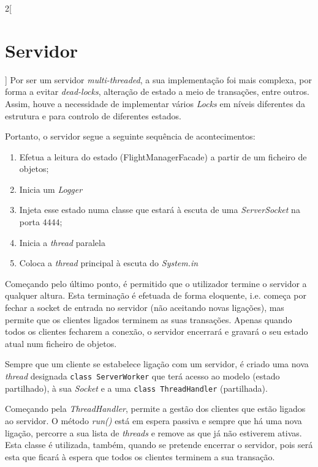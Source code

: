 \documentclass[a4paper,11pt]{article}
\begin{document}
\begin{multicols}{2}[\section{Servidor}]
    Por ser um servidor \textit{multi-threaded}, a sua implementação foi
    mais complexa, por forma a evitar \textit{dead-locks}, alteração de estado
    a meio de transações, entre outros.
    Assim, houve a necessidade de implementar vários \textit{Locks} em níveis
    diferentes da estrutura e para controlo de diferentes estados.
    
    Portanto, o servidor segue a seguinte sequência de acontecimentos:
    \begin{enumerate}
        \item Efetua a leitura do estado (FlightManagerFacade) a partir de um ficheiro de objetos;
        \item Inicia um \textit{Logger}
        \item Injeta esse estado numa classe que estará à escuta de uma \textit{ServerSocket} na porta $4444$;
        \item Inicia a \textit{thread} paralela
        \item Coloca a \textit{thread} principal à escuta do \textit{System.in}
    \end{enumerate}
    Começando pelo último ponto, é permitido que o utilizador termine o servidor a qualquer
    altura. Esta terminação é efetuada de forma eloquente, i.e. começa por fechar a socket
    de entrada no servidor (não aceitando novas ligações), mas permite que os clientes ligados terminem as suas transações.
    Apenas quando todos os clientes fecharem a conexão, o servidor encerrará e gravará 
    o seu estado atual num ficheiro de objetos.
    
    Sempre que um cliente se estabelece ligação com um servidor, é criado uma
    nova \textit{thread} designada \texttt{class ServerWorker}
    que terá acesso ao modelo (estado partilhado), à sua \textit{Socket}
    e a uma \texttt{class ThreadHandler} (partilhada).
    
    Começando pela \textit{ThreadHandler}, permite a gestão dos clientes que estão
    ligados ao servidor.
    O método \textit{run()} está em espera passiva e sempre que há uma nova ligação,
    percorre a sua lista de \textit{threads} e remove as que já não estiverem ativas.
    Esta classe é utilizada, também, quando se pretende encerrar o servidor, pois será
    esta que ficará à espera que todos os clientes terminem a sua transação.
    

\end{multicols}
\end{document}
